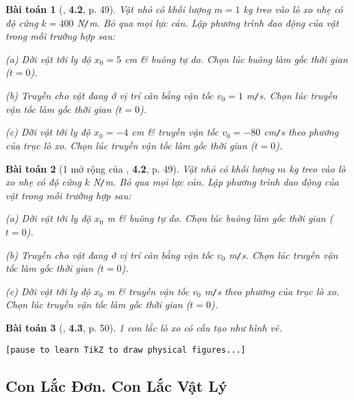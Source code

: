 \documentclass{article}
\numberwithin{equation}{section}
\newtheorem{baitoan}{Bài toán}[section]
\begin{document}
\begin{baitoan}[\cite{Giai_Toan_Trac_Nghiem_Vat_Ly_12_tap_1}, \textbf{4.2}, p. 49]
	Vật nhỏ có khối lượng $m = 1$ \emph{kg} treo vào lò xo nhẹ có độ cứng $k = 400$ \emph{N\texttt{/}m}. Bỏ qua mọi lực cản. Lập phương trình dao động của vật trong mỗi trường hợp sau:
	\begin{enumerate*}
		\item[(a)] Dời vật tới ly độ $x_0 = 5$ \emph{cm} \& buông tự do. Chọn lúc buông làm gốc thời gian ($t = 0$).
		\item[(b)] Truyền cho vật đang ở vị trí cân bằng vận tốc $v_0 = 1$ \emph{m\texttt{/}s}. Chọn lúc truyền vận tốc làm gốc thời gian ($t = 0$).
		\item[(c)] Dời vật tới ly độ $x_0 = -4$ \emph{cm} \& truyền vận tốc $v_0 = -80$ \emph{cm\texttt{/}s} theo phương của trục lò xo. Chọn lúc truyền vận tốc làm gốc thời gian ($t = 0$).
	\end{enumerate*}
\end{baitoan}

\begin{baitoan}[1 mở rộng của \cite{Giai_Toan_Trac_Nghiem_Vat_Ly_12_tap_1}, \textbf{4.2}, p. 49]
	Vật nhỏ có khối lượng $m$ \emph{kg} treo vào lò xo nhẹ có độ cứng $k$ \emph{N\texttt{/}m}. Bỏ qua mọi lực cản. Lập phương trình dao động của vật trong mỗi trường hợp sau:
	\begin{enumerate*}
		\item[(a)] Dời vật tới ly độ $x_0$ \emph{m} \& buông tự do. Chọn lúc buông làm gốc thời gian ($t = 0$).
		\item[(b)] Truyền cho vật đang ở vị trí cân bằng vận tốc $v_0$ \emph{m\texttt{/}s}. Chọn lúc truyền vận tốc làm gốc thời gian ($t = 0$).
		\item[(c)] Dời vật tới ly độ $x_0$ \emph{m} \& truyền vận tốc $v_0$ \emph{m\texttt{/}s} theo phương của trục lò xo. Chọn lúc truyền vận tốc làm gốc thời gian ($t = 0$).
	\end{enumerate*}
\end{baitoan}

\begin{baitoan}[\cite{Giai_Toan_Trac_Nghiem_Vat_Ly_12_tap_1}, \textbf{4.3}, p. 50]
	1 con lắc lò xo có cấu tạo như hình vẽ. 
\end{baitoan}
\texttt{[pause to learn TikZ to draw physical figures...]}


\subsection{Con Lắc Đơn. Con Lắc Vật Lý}
\end{document}
